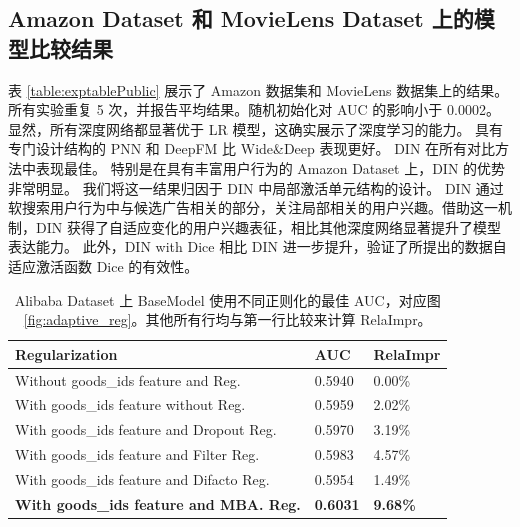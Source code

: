 \subsection{Amazon Dataset 和 MovieLens Dataset 上的模型比较结果}
表 \ref{table:exptablePublic} 展示了 Amazon 数据集和 MovieLens 数据集上的结果。
所有实验重复 5 次，并报告平均结果。随机初始化对 AUC 的影响小于 0.0002。
显然，所有深度网络都显著优于 LR 模型，这确实展示了深度学习的能力。
具有专门设计结构的 PNN 和 DeepFM 比 Wide\&Deep 表现更好。
DIN 在所有对比方法中表现最佳。
特别是在具有丰富用户行为的 Amazon Dataset 上，DIN 的优势非常明显。
我们将这一结果归因于 DIN 中局部激活单元结构的设计。
DIN 通过软搜索用户行为中与候选广告相关的部分，关注局部相关的用户兴趣。借助这一机制，DIN 获得了自适应变化的用户兴趣表征，相比其他深度网络显著提升了模型表达能力。
此外，DIN with Dice 相比 DIN 进一步提升，验证了所提出的数据自适应激活函数 Dice 的有效性。




\begin{table}[!t]
\caption{Alibaba Dataset 上 BaseModel 使用不同正则化的最佳 AUC，对应图 \ref{fig:adaptive_reg}。其他所有行均与第一行比较来计算 RelaImpr。}
\small
\centering
\begin{threeparttable}
\begin{tabular}{p{5cm} p{0.6cm}<{\centering} p{0.8cm}<{\centering}}
\toprule
 Regularization    & AUC  &RelaImpr \\ \midrule
Without goods\_ids feature and Reg. & 0.5940 & 0.00\% \\
With goods\_ids feature without Reg. & 0.5959  & 2.02\% \\
With goods\_ids feature and Dropout Reg. & 0.5970  & 3.19\%  \\
With goods\_ids feature and Filter Reg.  & 0.5983& 4.57\%  \\
With goods\_ids feature and Difacto Reg.  & 0.5954 & 1.49\%  \\
\textbf{With goods\_ids feature and MBA. Reg.}  & \textbf{0.6031}  & \textbf{9.68\%}  \\ \bottomrule
\end{tabular}
\end{threeparttable}
\label{table:expreg}
\end{table}



